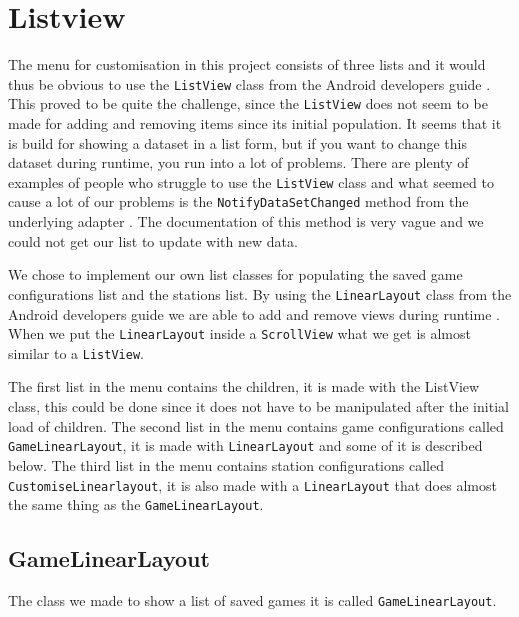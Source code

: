 \section{Listview}\label{sec:listview}
The menu for customisation in this project consists of three lists and it would thus be obvious to use the \lstinline|ListView| class from the Android developers guide \citep{androidlayouts}. This proved to be quite the challenge, since the \lstinline|ListView| does not seem to be made for adding and removing items since its initial population. It seems that it is build for showing a dataset in a list form, but if you want to change this dataset during runtime, you run into a lot of problems. There are plenty of examples of people who struggle to use the \lstinline|ListView| class and what seemed to cause a lot of our problems is the \lstinline|NotifyDataSetChanged| method from the underlying adapter \citep{listviewfail,notifydatasetchanged}. The documentation of this method is very vague and we could not get our list to update with new data.

We chose to implement our own list classes for populating the saved game configurations list and the stations list. By using the \lstinline|LinearLayout| class from the Android developers guide we are able to add and remove views during runtime \citep{androidlayouts}. When we put the \lstinline|LinearLayout| inside a \lstinline|ScrollView| what we get is almost similar to a \lstinline|ListView|.

The first list in the menu contains the children, it is made with the ListView class, this could be done since it does not have to be manipulated after the initial load of children. The second list in the menu contains game configurations called \lstinline|GameLinearLayout|, it is made with \lstinline|LinearLayout| and some of it is described below. The third list in the menu contains station configurations called \lstinline|CustomiseLinearlayout|, it is also made with a \lstinline|LinearLayout| that does almost the same thing as the \lstinline|GameLinearLayout|.

\subsection*{GameLinearLayout}

The class we made to show a list of saved games it is called \lstinline|GameLinearLayout|.


